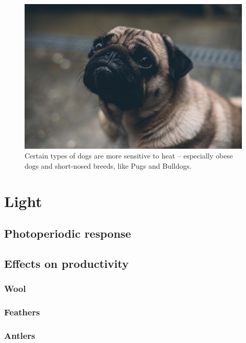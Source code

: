 \documentclass[]{book}
\begin{document}
\begin{figure}

{\centering \includegraphics[width=1\linewidth]{figures/pug} 

}

\caption{Certain types of dogs are more sensitive to heat – especially obese dogs and short-nosed breeds, like Pugs and Bulldogs.}\label{fig:heat-canine}
\end{figure}

\chapter{Light}\label{light}

\section{Photoperiodic response}\label{photoperiodic-response}

\section{Effects on productivity}\label{effects-on-productivity}

\subsection{Wool}\label{wool}

\subsection{Feathers}\label{feathers}

\subsection{Antlers}\label{antlers}
\end{document}
